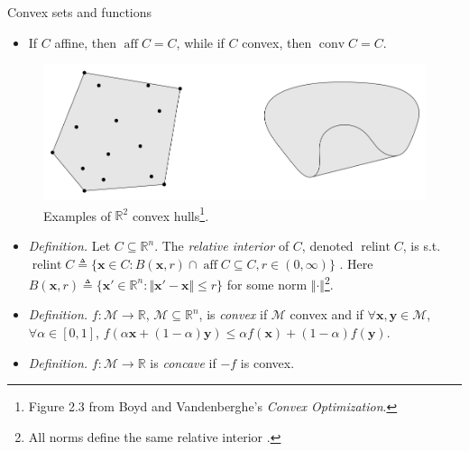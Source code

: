 \documentclass{beamer}
\numberwithin{equation}{section}
\begin{document}
\begin{frame}{Convex sets and functions}
    \begin{itemize}
        \item
        If $ C $ affine, then $ \operatorname{aff} C = C $, while if $ C $
        convex, then $ \operatorname{conv} C = C $.
    \end{itemize}
    \begin{figure}
        \centering
        \vspace{-3 pt}
        \includegraphics[scale = 0.24]{bv_fig_2.3.png}
        \vspace{-10 pt}
        \caption{
            Examples of $ \mathbb{R}^2 $ convex hulls\footnote{
                Figure 2.3 from Boyd and Vandenberghe's
                \textit{Convex Optimization}.
            }.
        }
        \vspace{-10 pt}
    \end{figure}
    \begin{itemize}
        \item
        \textit{Definition.} Let $ C \subseteq \mathbb{R}^n $. The
        \textit{relative interior} of $ C $, denoted
        $ \operatorname{relint} C $, is s.t. $ \operatorname{relint} C
        \triangleq \{\mathbf{x} \in C : B(\mathbf{x}, r) \cap
        \operatorname{aff} C \subseteq C, r \in (0, \infty)\} $
        \cite{bv_convex_opt}. Here
        $ B(\mathbf{x}, r) \triangleq \{\mathbf{x}' \in \mathbb{R}^n :
        \Vert\mathbf{x}' - \mathbf{x}\Vert \le r\} $ for some norm
        $ \Vert\cdot\Vert $\footnote{
            All norms define the same relative interior \cite{bv_convex_opt}.        
        }.

        \item
        \textit{Definition.} $ f : \mathcal{M} \rightarrow
        \mathbb{R} $, $ \mathcal{M} \subseteq \mathbb{R}^n $, is
        \textit{convex} if $ \mathcal{M} $ convex and if
        $ \forall \mathbf{x}, \mathbf{y} \in \mathcal{M} $,
        $ \forall \alpha \in [0, 1] $,
        $ f(\alpha\mathbf{x} + (1 - \alpha)\mathbf{y}) \le
        \alpha f(\mathbf{x}) + (1 - \alpha)f(\mathbf{y}) $.

        \item
        \textit{Definition.} $ f : \mathcal{M} \rightarrow \mathbb{R} $ is
        \textit{concave} if $ -f $ is convex.
    \end{itemize}

    \bigskip
\end{frame}
\end{document}

